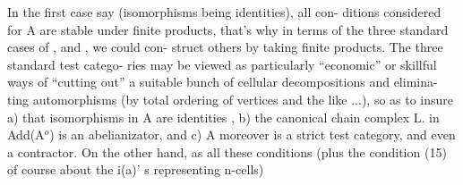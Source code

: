 In the first case say (isomorphisms being identities),  all con-%
ditions considered for A are stable under finite products,  that's why
in terms of the three standard cases of \hand{$\Delta$}, \hand{$\square$} and ,  we could con-%
struct others by taking finite products.  The three standard test catego-%
ries  may be viewed as particularly ``economic'' or skillful ways of
``cutting out'' a suitable bunch of cellular decompositions\hand{,} and  elimina-%
ting automorphisms (by total ordering of vertices and the like ...),
so as to insure\hand{:} a) that isomorphisms in A are identities ,  b)  the
canonical chain complex L.  in Add(A$^{o}$)  is an abelianizator,  and  c)
A moreover is a strict test category,  and even a contractor.  On the
other hand,  as all these conditions  (plus the condition (15) of course
about the i(a)' s  representing n-cells)  


